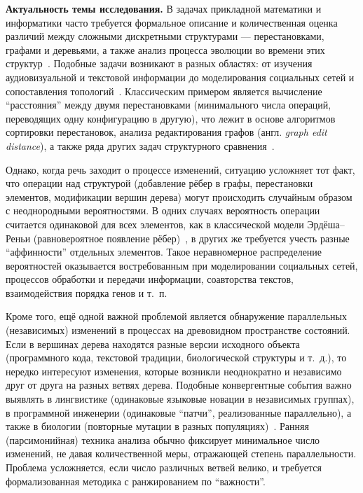 

\textbf{Актуальность темы исследования.}  
В задачах прикладной математики и информатики часто требуется формальное описание и количественная оценка различий между сложными дискретными структурами --- перестановками, графами и деревьями, а также анализ процесса эволюции во времени этих структур~\cite{Penny2004,Bunke1997}.  
Подобные задачи возникают в разных областях: от изучения аудиовизуальной и текстовой информации до моделирования социальных сетей и сопоставления топологий~\cite{baret2004phylogenetic,McCollum2023,Piar2020,Newman2003}.  
Классическим примером является вычисление ``расстояния'' между двумя перестановками (минимального числа операций, переводящих одну конфигурацию в другую), что лежит в основе алгоритмов сортировки перестановок, анализа редактирования графов (англ. \textit{graph edit distance}), а также ряда других задач структурного сравнения~\cite{Pevzner03}.  

Однако, когда речь заходит о процессе изменений, ситуацию усложняет тот факт, что операции над структурой (добавление рёбер в графы, перестановки элементов, модификации вершин дерева) могут происходить случайным образом с неоднородными вероятностями.  
В одних случаях вероятность операции считается одинаковой для всех элементов, как в классической модели \mbox{Эрдёша--Реньи} (равновероятное появление рёбер)~\cite{Erdos1959}, в других же требуется учесть разные ``аффинности'' отдельных элементов.  
Такое неравномерное распределение вероятностей оказывается востребованным при моделировании социальных сетей, процессов обработки и передачи информации, соавторства текстов, взаимодействия порядка генов и т.~п.  

Кроме того, ещё одной важной проблемой является обнаружение параллельных (независимых) изменений в процессах на древовидном пространстве состояний.  
Если в вершинах дерева находятся разные версии исходного объекта (программного кода, текстовой традиции, биологической структуры и т.~д.), то нередко интересуют изменения, которые возникли неоднократно и независимо друг от друга на разных ветвях дерева.  
Подобные конвергентные события важно выявлять в лингвистике (одинаковые языковые новации в независимых группах), в программной инженерии (одинаковые ``патчи'', реализованные параллельно), а также в биологии (повторные мутации в разных популяциях)~\cite{Rokas2008}.  
Ранняя (парсимонийная) техника анализа обычно фиксирует минимальное число изменений, не давая количественной меры, отражающей степень параллельности.  
Проблема усложняется, если число различных ветвей велико, и требуется формализованная методика с ранжированием по ``важности''. 

